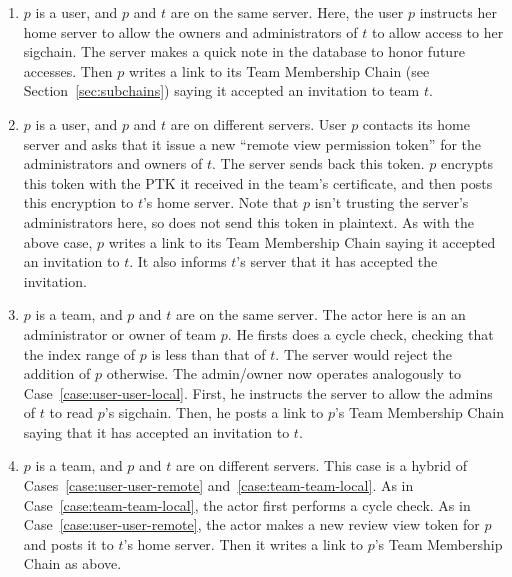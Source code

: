 \begin{enumerate}
\item $p$ is a user, and $p$ and $t$ are on the same server.
%
Here, the user $p$
instructs her home server to allow the owners and administrators of $t$ to allow
access to her sigchain. The server makes a quick note in the database to honor
future accesses. Then $p$ writes a link to its Team Membership Chain (see Section~\ref{sec:subchains}) 
saying it accepted an invitation to team $t$.
\label{case:user-user-local}

\item $p$ is a user, and $p$ and $t$ are on different servers.
%
User $p$ contacts its home server and asks that it issue a new 
``remote view permission token'' for the administrators and owners of $t$.
The server sends back this token. $p$ encrypts this token with the PTK
it received in the team's certificate, and then posts this encryption to
$t$'s home server. Note that $p$ isn't trusting the server's administrators 
here, so does not send this token in plaintext. As with the above case,
$p$ writes a link to its Team Membership Chain saying it accepted an invitation
to $t$. It also informs $t$'s server that it has accepted the invitation.
\label{case:user-user-remote}

\item $p$ is a team, and $p$ and $t$ are on the same server. 
% 
The actor here is an an administrator or owner of team $p$. He firsts does a
cycle check, checking that the index range of $p$ is less than that of $t$.
The server would reject the addition of $p$ otherwise. The admin/owner now
operates analogously to Case~\ref{case:user-user-local}.  First, he
instructs the server to allow the admins of $t$ to read $p$'s sigchain.
Then, he posts a link to $p$'s Team Membership Chain saying that it has
accepted an invitation to $t$.
\label{case:team-team-local}
    
\item $p$ is a team, and $p$ and $t$ are on different servers.
%
This case is a hybrid of Cases~\ref{case:user-user-remote} and~\ref{case:team-team-local}.
As in Case~\ref{case:team-team-local}, the actor first performs a cycle check.
As in Case~\ref{case:user-user-remote}, the actor makes a new review view token
for $p$ and posts it to $t$'s home server. Then it writes a link to $p$'s
Team Membership Chain as above.
\label{case:team-team-remote}

\end{enumerate}

